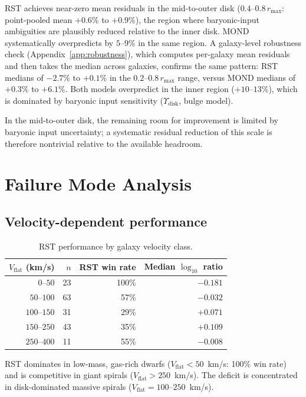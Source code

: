 \documentclass[11pt,a4paper]{article}
\begin{document}
RST achieves near-zero mean residuals in the mid-to-outer disk ($0.4$--$0.8\,r_{\max}$: point-pooled mean $+0.6\%$ to $+0.9\%$), the region where baryonic-input ambiguities are plausibly reduced relative to the inner disk.
MOND systematically overpredicts by $5$--$9\%$ in the same region.
A galaxy-level robustness check (Appendix~\ref{app:robustness}), which computes per-galaxy mean residuals and then takes the median across galaxies, confirms the same pattern: RST medians of $-2.7\%$ to $+0.1\%$ in the $0.2$--$0.8\,r_{\max}$ range, versus MOND medians of $+0.3\%$ to $+6.1\%$.
Both models overpredict in the inner region ($+10$--$13\%$), which is dominated by baryonic input sensitivity ($\Upsilon_{\mathrm{disk}}$, bulge model).

In the mid-to-outer disk, the remaining room for improvement is limited by baryonic input uncertainty; a systematic residual reduction of this scale is therefore nontrivial relative to the available headroom.

\section{Failure Mode Analysis}
\label{sec:failures}

\subsection{Velocity-dependent performance}
\label{sec:velocity}

\begin{table}[h]
\centering
\caption{RST performance by galaxy velocity class.}
\label{tab:velocity}
\begin{tabular}{rrrr}
\toprule
$V_{\mathrm{flat}}$ (km/s) & $n$ & RST win rate & Median $\log_{10}$ ratio \\
\midrule
$0$--$50$ & 23 & 100\% & $-0.181$ \\
$50$--$100$ & 63 & 57\% & $-0.032$ \\
$100$--$150$ & 31 & 29\% & $+0.071$ \\
$150$--$250$ & 43 & 35\% & $+0.109$ \\
$250$--$400$ & 11 & 55\% & $-0.008$ \\
\bottomrule
\end{tabular}
\end{table}

RST dominates in low-mass, gas-rich dwarfs ($V_{\mathrm{flat}} < 50$~km/s: 100\% win rate) and is competitive in giant spirals ($V_{\mathrm{flat}} > 250$~km/s).
The deficit is concentrated in disk-dominated massive spirals ($V_{\mathrm{flat}} = 100$--$250$~km/s).
\end{document}
